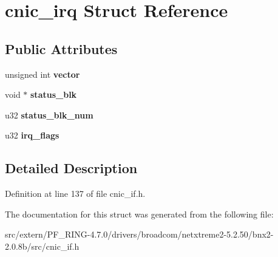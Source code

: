 \hypertarget{structcnic__irq}{
\section{cnic\_\-irq Struct Reference}
\label{structcnic__irq}
}
\subsection*{Public Attributes}
\begin{DoxyCompactItemize}
\item 
\hypertarget{structcnic__irq_a27927174c5778371a6b961e8fc78e5a4}{
unsigned int {\bfseries vector}}
\label{structcnic__irq_a27927174c5778371a6b961e8fc78e5a4}

\item 
\hypertarget{structcnic__irq_a29f5486b9bbf6489b7a28c8a8d13019b}{
void $\ast$ {\bfseries status\_\-blk}}
\label{structcnic__irq_a29f5486b9bbf6489b7a28c8a8d13019b}

\item 
\hypertarget{structcnic__irq_a7b603a5973424748d7428c65538774df}{
u32 {\bfseries status\_\-blk\_\-num}}
\label{structcnic__irq_a7b603a5973424748d7428c65538774df}

\item 
\hypertarget{structcnic__irq_a2702dbea5772a06029529f56a2c66ac2}{
u32 {\bfseries irq\_\-flags}}
\label{structcnic__irq_a2702dbea5772a06029529f56a2c66ac2}

\end{DoxyCompactItemize}


\subsection{Detailed Description}


Definition at line 137 of file cnic\_\-if.h.



The documentation for this struct was generated from the following file:\begin{DoxyCompactItemize}
\item 
src/extern/PF\_\-RING-\/4.7.0/drivers/broadcom/netxtreme2-\/5.2.50/bnx2-\/2.0.8b/src/cnic\_\-if.h\end{DoxyCompactItemize}
